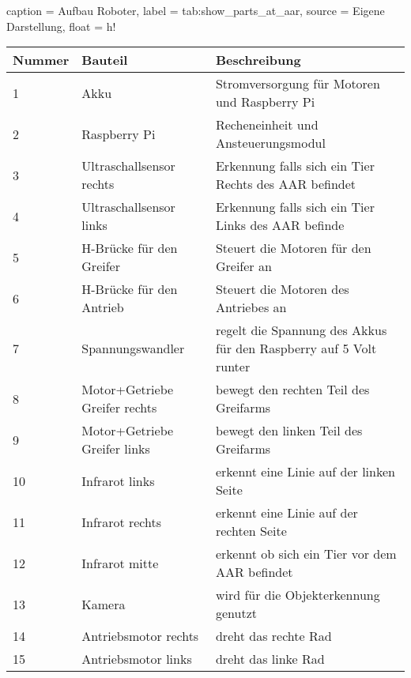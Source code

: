 \begin{dhbwtable}{%
    caption	= Aufbau Roboter,
    label	= tab:show_parts_at_aar,
    source	= Eigene Darstellung,
    float   = h!
}
    \begin{tabularx}{\textwidth}{lXX}
        \toprule
        \textbf{Nummer}     & \textbf{Bauteil}              & \textbf{Beschreibung} \\\midrule
        1   	            & Akku                          & Stromversorgung für Motoren und Raspberry Pi \\
        2                   & Raspberry Pi                  & Recheneinheit und Ansteuerungsmodul \\
        3                   & Ultraschallsensor rechts      & Erkennung falls sich ein Tier Rechts des AAR befindet \\
        4                   & Ultraschallsensor links       & Erkennung falls sich ein Tier Links des AAR befinde \\
        5                   & H-Brücke für den Greifer      & Steuert die Motoren für den Greifer an \\
        6                   & H-Brücke für den Antrieb      & Steuert die Motoren des Antriebes an \\
        7                   & Spannungswandler              & regelt die Spannung des Akkus für den Raspberry auf 5 Volt runter \\
        8                   & Motor+Getriebe Greifer rechts & bewegt den rechten Teil des Greifarms \\
        9                   & Motor+Getriebe Greifer links  & bewegt den linken Teil des Greifarms \\
        10                  & Infrarot links                & erkennt eine Linie auf der linken Seite \\
        11                  & Infrarot rechts               & erkennt eine Linie auf der rechten Seite \\
        12                  & Infrarot mitte                & erkennt ob sich ein Tier vor dem AAR befindet \\
        13                  & Kamera                        & wird für die Objekterkennung genutzt \\
        14                  & Antriebsmotor rechts          & dreht das rechte Rad \\
        15                  & Antriebsmotor links           & dreht das linke Rad \\\bottomrule
    \end{tabularx}    
\end{dhbwtable}

